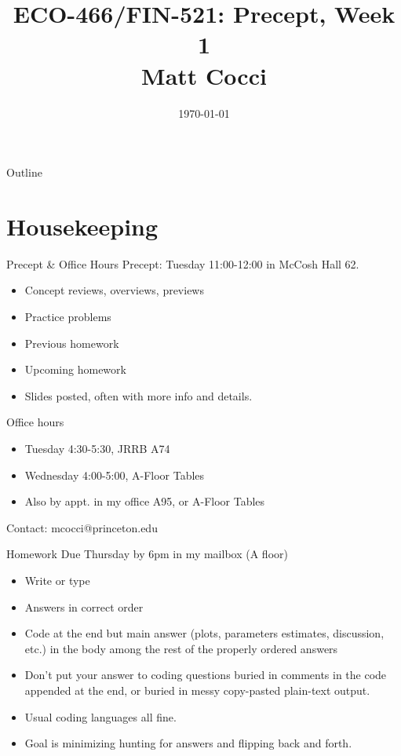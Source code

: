 \documentclass[handout]{beamer}
\title[]{ECO-466/FIN-521: Precept, Week 1 \\ Matt Cocci}
\author[]{}
\date{\today}
\begin{document}
\begin{frame}[plain]
\titlepage
\end{frame}


\begin{frame}{Outline}
\tableofcontents[hideallsubsections]
\end{frame}



\section{Housekeeping}

\begin{frame}{Precept \& Office Hours}
\alert{Precept}: Tuesday 11:00-12:00 in McCosh Hall 62.
\begin{itemize}
  \item Concept reviews, overviews, previews
  \item Practice problems
  \item Previous homework
  \item Upcoming homework
  \item Slides posted, often with more info and details.
\end{itemize}
\alert{Office hours}
\begin{itemize}
  \item Tuesday 4:30-5:30, JRRB A74
  \item Wednesday 4:00-5:00, A-Floor Tables
  \item Also by appt. in my office A95, or A-Floor Tables
\end{itemize}
\alert{Contact}: mcocci@princeton.edu
\end{frame}


\begin{frame}[shrink]{Homework}
Due Thursday by 6pm in my mailbox (A floor)
\begin{itemize}
  \item Write or type
  \item Answers in correct order
  \item Code at the end but main answer (plots, parameters estimates,
    discussion, etc.) in the body among the rest of the properly ordered
    answers
  \item Don't put your answer to coding questions buried in comments in
    the code appended at the end, or buried in messy copy-pasted
    plain-text output.
  \item Usual coding languages all fine.
  \item Goal is minimizing hunting for answers and flipping back and
    forth.
\end{itemize}
\end{frame}
\end{document}
